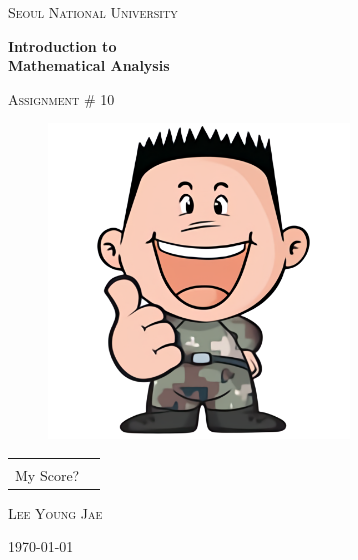 \documentclass{article}
\begin{document}
\begin{titlepage}
\centering
{\scshape\LARGE Seoul National University \par}
\vspace{1.5cm}
{\huge\bfseries Introduction to\\Mathematical Analysis\par}
\vspace{1cm}
{\scshape\Large Assignment \# 10\par}

\vspace{1cm}

\begin{figure}[ht!]
\centering
\includegraphics[width=80mm]{good.png}
\end{figure}

\vspace{1cm}

\arrayrulewidth=1.2pt
\begin{tabular}{p{2.5cm}p{2cm}}
\centering
& \\
\cline{2-2}
\vspace{-.73cm}
My Score? & \\
\end{tabular}



\vfill
{}
\vspace{.7cm}\par
\textsc{\large Lee Young Jae}
\vspace{.7cm}\par
{\Large \today\par}
\end{titlepage}

\setlength{\parindent}{0cm}
\end{document}
